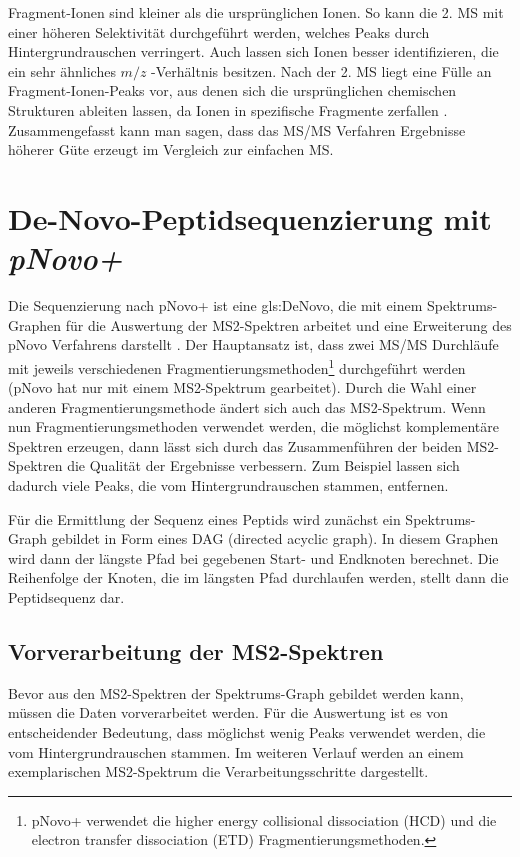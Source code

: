 \documentclass[a4paper, 12pt]{article}
\newcommand{\dashAndSpace}{\textendash \space}
\newcommand{\massCharge}{$ m/z $ }
\begin{document}
Fragment-Ionen sind kleiner als die ursprünglichen Ionen. So kann die 2. MS mit einer höheren Selektivität durchgeführt werden, welches Peaks durch Hintergrundrauschen verringert. Auch lassen sich Ionen besser identifizieren, die ein sehr ähnliches \massCharge-Verhältnis besitzen. Nach der 2. MS liegt eine Fülle an Fragment-Ionen-Peaks vor, aus denen sich die ursprünglichen chemischen Strukturen ableiten lassen, da Ionen in spezifische Fragmente zerfallen \cite{Gross2013}. Zusammengefasst kann man sagen, dass das MS/MS Verfahren Ergebnisse höherer Güte erzeugt im Vergleich zur einfachen MS.

\section{De-Novo-Peptidsequenzierung mit \emph{pNovo+}}\label{s:pNovoPlusSeq}
Die Sequenzierung nach pNovo+ ist eine \gls{gls:DeNovo}, die mit einem Spek\-trums-Graphen für die Auswertung der MS2-Spektren arbeitet und eine Erweiterung des pNovo Verfahrens darstellt \cite{pNovo}. Der Hauptansatz ist, dass zwei MS/MS Durchläufe mit jeweils verschiedenen Fragmentierungsmethoden\footnote{pNovo+ verwendet die higher energy
collisional dissociation (HCD) und die electron transfer dissociation (ETD) Fragmentierungsmethoden.} durchgeführt werden (pNovo hat nur mit einem MS2-Spektrum gearbeitet). Durch die Wahl einer anderen Fragmentierungsmethode ändert sich auch das MS2-Spektrum. Wenn nun Fragmentierungsmethoden verwendet werden, die möglichst komplementäre Spektren erzeugen, dann lässt sich durch das Zusammenführen der beiden MS2-Spektren die Qualität der Ergebnisse verbessern. Zum Beispiel lassen sich dadurch viele Peaks, die vom Hintergrundrauschen stammen, entfernen.

Für die Ermittlung der Sequenz eines Peptids wird zunächst ein Spektrums-Graph gebildet \dashAndSpace in Form eines DAG (directed acyclic graph). In diesem Graphen wird dann der längste Pfad bei gegebenen Start- und Endknoten berechnet. Die Reihenfolge der Knoten, die im längsten Pfad durchlaufen werden, stellt dann die Peptidsequenz dar.

\subsection{Vorverarbeitung der MS2-Spektren}\label{ss:Vorverarbeitung}
Bevor aus den MS2-Spektren der Spektrums-Graph gebildet werden kann, müssen die Daten vorverarbeitet werden. Für die Auswertung ist es von entscheidender Bedeutung, dass möglichst wenig Peaks verwendet werden, die vom Hintergrundrauschen stammen. Im weiteren Verlauf werden an einem exemplarischen MS2-Spektrum die Verarbeitungsschritte dargestellt.\\
\end{document}
